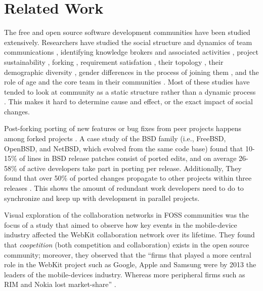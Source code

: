 \documentclass[11pt]{report}
\begin{document}
\section{Related Work}
\label{relatedwork}

The free and open source software development communities have been studied extensively. Researchers have studied the social structure and dynamics of team communications \cite{Bird}\cite{Guzzi}\cite{HowisonSocialDynamics}\cite{HowisonFlossMole}\cite{Nakakoji}, identifying knowledge brokers and associated activities \cite{Sowe}, project sustainability \cite{Nakakoji}\cite{NymanForkingSustainability}, forking \cite{NymanCodeForking}, requirement satisfation \cite{Ernst}, their topology \cite{Bird}, their demographic diversity \cite{Kunegis}, gender differences in the process of joining them \cite{Kuechler}, and the role of age and the core team in their communities \cite{AzarbakhtOSS2014}\cite{AzarbakhtINSNA2014}\cite{DavidsonVLHCC2014}\cite{Torres}. Most of these studies have tended to look at community as a static structure rather than a dynamic process \cite{CrowstonFLOSSWhatWeKnow}. This makes it hard to determine cause and effect, or the exact impact of social changes.

Post-forking porting of new features or bug fixes from peer projects happens among forked projects \cite{Baishakhi}. A case study of the BSD family (i.e., FreeBSD, OpenBSD, and NetBSD, which evolved from the same code base) found that 10-15\% of lines in BSD release patches consist of ported edits, and on average 26-58\% of active developers take part in porting per release. Additionally, They found that over 50\% of ported changes propagate to other projects within three releases \cite{Baishakhi}. This shows the amount of redundant work developers need to do to synchronize and keep up with development in parallel projects. 

Visual exploration of the collaboration networks in FOSS communities was the focus of a study that aimed to observe how key events in the mobile-device industry affected the WebKit collaboration network over its lifetime. \cite{JoseWebKit} They found that \textit{coopetition} (both competition and collaboration) exists in the open source community; moreover, they observed that the ``firms that played a more central role in the WebKit project such as Google, Apple and Samsung were by 2013 the leaders of the mobile-devices industry. Whereas more peripheral firms such as RIM and Nokia lost market-share'' \cite{JoseWebKit}. 
\end{document}
